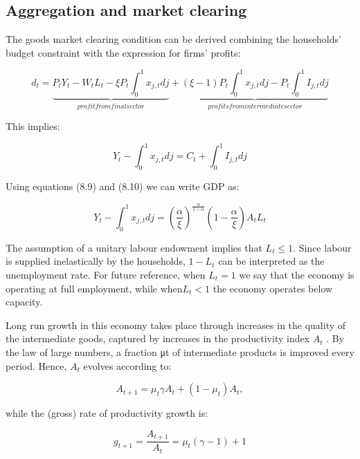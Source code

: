 \documentclass[cn,10pt,math=newtx,citestyle=gb7714-2015,bibstyle=gb7714-2015]{elegantbook}
\begin{document}
{{\subsection{Aggregation and market clearing}

The goods market clearing condition can be derived combining the households’ budget constraint with the
expression for firms’ profits:

\begin{equation}
	d_t = \underbrace{P_t Y_t-W_t L_t -\xi P_t \int_0^1 x_{j,t}dj}_{profit from final sector}+\underbrace{(\xi -1 )P_t \int_0^1 x_{j,t}dj-P_t \int_0^1I_{j,t}dj}_{profits from intermediate sector}
\end{equation}

This implies:

\begin{equation}
	Y_t - \int_0^1 x_{j,t}dj = C_t +\int_0^1I_{j,t}dj
\end{equation}
	
	Using equations (8.9) and (8.10) we can write GDP as:
	
	\begin{equation}
		Y_t - \int_0^1 x_{j,t}dj = \left(\frac{\alpha}{\xi}\right)^{\frac{\alpha}{1-\alpha}}\left(1-\frac{\alpha}{\xi}\right)A_tL_t
	\end{equation}
	
	The assumption of a unitary labour endowment implies that $L_t \le 1$. Since labour is supplied inelastically by the households, $1−L_t$ can be interpreted as the unemployment rate. For future reference, when $L_t =1 $ we say that the economy is operating at full employment, while when$L_t <1$ the economy operates below capacity.
	
    Long run growth in this economy takes place through increases in the quality of the intermediate goods, captured by increases in the productivity index $A_t$ . By the law of large numbers, a fraction μt of intermediate products is improved every period. Hence, $A_t$ evolves according to:

\begin{equation}
A_{t+1}=\mu_t \gamma A_t+(1-\mu_t )A_t ,
\end{equation}

while the (gross) rate of productivity growth is:

\begin{equation}
	g_{t+1}= \frac{A_{t+1}}{A_t}=\mu_t(\gamma -1 ) +1
\end{equation}

}}
\end{document}
